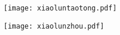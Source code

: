 \begin{figure}[htbp]
\centering
\texttt{[image: xiaoluntaotong.pdf]}
\end{figure}
\begin{figure}[htbp]
\centering
\texttt{[image: xiaolunzhou.pdf]}
\end{figure}